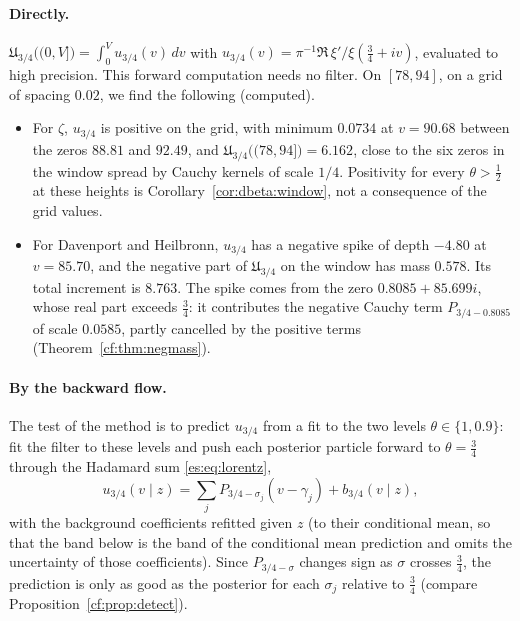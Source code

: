 \paragraph{Directly.} $\mathfrak U_{3/4}\bigl((0,V]\bigr)=\int_0^Vu_{3/4}(v)\,dv$ with $u_{3/4}(v)=\pi^{-1}\Re\,\xi'/\xi(\tfrac34+iv)$, evaluated to high precision. This forward computation needs no filter. On $[78,94]$, on a grid of spacing $0.02$, we find the following (computed).
\begin{itemize}
\item For $\zeta$, $u_{3/4}$ is positive on the grid, with minimum $0.0734$ at $v=90.68$ between the zeros $88.81$ and $92.49$, and $\mathfrak U_{3/4}\bigl((78,94]\bigr)=6.162$, close to the six zeros in the window spread by Cauchy kernels of scale $1/4$. Positivity for every $\theta>\frac12$ at these heights is Corollary~\ref{cor:dbeta:window}, not a consequence of the grid values.
\item For Davenport and Heilbronn, $u_{3/4}$ has a negative spike of depth $-4.80$ at $v=85.70$, and the negative part of $\mathfrak U_{3/4}$ on the window has mass $0.578$. Its total increment is $8.763$. The spike comes from the zero $0.8085+85.699i$, whose real part exceeds $\frac34$: it contributes the negative Cauchy term $P_{3/4-0.8085}$ of scale $0.0585$, partly cancelled by the positive terms (Theorem~\ref{cf:thm:negmass}).
\end{itemize}

\paragraph{By the backward flow.} The test of the method is to predict $u_{3/4}$ from a fit to the two levels $\theta\in\{1,0.9\}$: fit the filter to these levels and push each posterior particle forward to $\theta=\frac34$ through the Hadamard sum \eqref{es:eq:lorentz},
\[
u_{3/4}(v\mid z)=\sum_jP_{3/4-\sigma_j}(v-\gamma_j)+b_{3/4}(v\mid z),
\]
with the background coefficients refitted given $z$ (to their conditional mean, so that the band below is the band of the conditional mean prediction and omits the uncertainty of those coefficients). Since $P_{3/4-\sigma}$ changes sign as $\sigma$ crosses $\frac34$, the prediction is only as good as the posterior for each $\sigma_j$ relative to $\frac34$ (compare Proposition~\ref{cf:prop:detect}).

